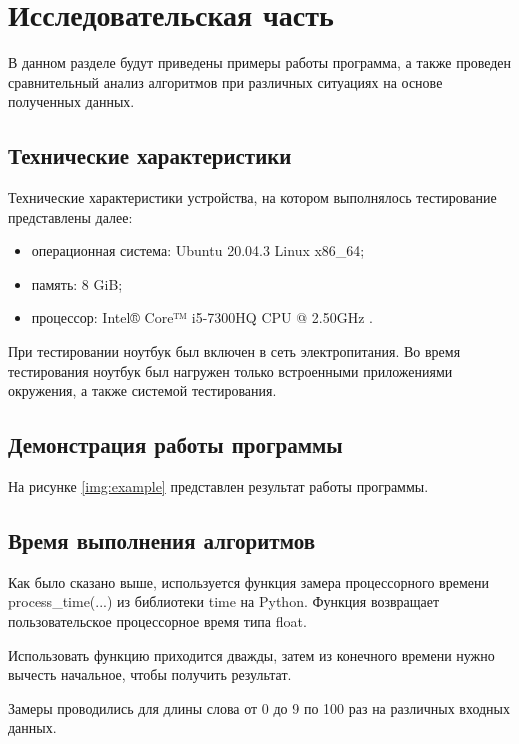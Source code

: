 \chapter{Исследовательская часть}

В данном разделе будут приведены примеры работы программа, а также проведен сравнительный анализ алгоритмов при различных ситуациях на основе полученных данных.

\section{Технические характеристики}

Технические характеристики устройства, на котором выполнялось тестирование представлены далее:

\begin{itemize}
    \item операционная система: Ubuntu 20.04.3 \cite{ubuntu} Linux \cite{linux} x86\_64;
    \item память: 8 GiB;
    \item процессор: Intel® Core™ i5-7300HQ CPU @ 2.50GHz \cite{intel}.
\end{itemize}

При тестировании ноутбук был включен в сеть электропитания. Во время тестирования ноутбук был нагружен только встроенными приложениями окружения, а также системой тестирования.

\section{Демонстрация работы программы}

На рисунке \ref{img:example} представлен результат работы программы.

\clearpage

\section{Время выполнения алгоритмов}

Как было сказано выше, используется функция замера процессорного времени process\_time(...) из библиотеки time на Python. Функция возвращает пользовательское процессорное время типа float.

Использовать функцию приходится дважды, затем из конечного времени нужно вычесть начальное, чтобы получить результат.

Замеры проводились для длины слова от 0 до 9 по 100 раз на различных входных данных.

